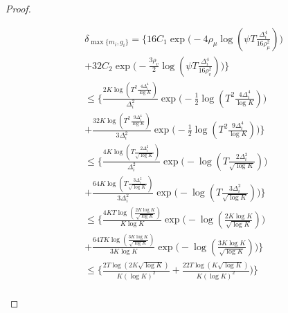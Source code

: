 \begin{proof}
\begin{small}
\begin{align*}
& \delta_{\max\lbrace m_{i}, g_{i}\rbrace}= \bigg\lbrace 16 C_1\exp\bigg(-4\rho_{\mu}\log (\psi T\frac{\Delta_{i}^{4}}{16\rho_{\mu}^{2}})\bigg)\\
& + 32C_2\exp\bigg(- \frac{3\rho_v}{2} \log(\psi T\frac{\Delta_{i}^{4}}{16\rho_{v}^{2}}) \bigg) \bigg\rbrace\\
&\leq \bigg\lbrace  \frac{2K\log ( T^2 \frac{4\Delta_{i}^{4}}{\log K})}{\Delta_{i}^{2}}\exp\bigg(-\frac{1}{2}\log ( T^2\frac{4\Delta_{i}^{4}}{\log K})\bigg)\\
& + \frac{32K\log ( T^2 \frac{9\Delta_{i}^{4}}{\log K})}{3\Delta_{i}^{2}}\exp\bigg(- \frac{1}{2} \log( T^2 \frac{9\Delta_{i}^{4}}{\log K}) \bigg) \bigg\rbrace\\
&\leq \bigg\lbrace  \frac{4K\log ( T \frac{2\Delta_{i}^{2}}{\sqrt{\log K}})}{\Delta_{i}^{2}}\exp\bigg(-\log ( T\frac{2\Delta_{i}^{2}}{\sqrt{\log K}})\bigg)\\
& + \frac{64K\log ( T \frac{3\Delta_{i}^{2}}{\sqrt{\log K}})}{3\Delta_{i}^{2}}\exp\bigg(- \log( T \frac{3\Delta_{i}^{2}}{\sqrt{\log K}}) \bigg) \bigg\rbrace\\
&\leq \bigg\lbrace  \frac{4KT\log ( \frac{2 K\log K}{\sqrt{\log K}})}{K\log K}\exp\bigg(-\log ( \frac{2K\log K}{\sqrt{\log K}})\bigg)\\
& + \frac{64TK\log (\frac{3 K\log K}{\sqrt{\log K}})}{3 K\log K}\exp\bigg(- \log( \frac{3 K\log K}{\sqrt{\log K}}) \bigg) \bigg\rbrace\\
&\leq \bigg\lbrace  \frac{2T\log (2 K\sqrt{\log K})}{K (\log K)^2}
 + \frac{22T\log ( K\sqrt{\log K})}{ K(\log K)^2}\bigg) \bigg\rbrace\\
\end{align*}
\end{small}


\end{proof}
